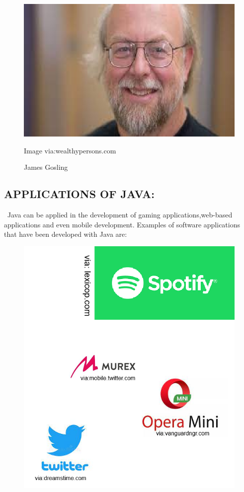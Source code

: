 \documentclass[12pt]{article}
\begin{document}
           
\begin{figure}[h]
	\includegraphics[width=0.7\linewidth]{screenshot009}
	\caption{James Gosling}{Image via:wealthypersons.com}
	\label{fig:screenshot009}
\end{figure}

\newpage

\subsection{APPLICATIONS OF JAVA:}
           \ Java can be applied in the development of gaming applications,web-based applications and even mobile development. Examples of software applications that have been developed with Java are:
           
\begin{figure}[h]
	\includegraphics[width=0.7\linewidth]{screenshot010}
	\caption{}
	\label{fig:screenshot010}
\end{figure}
\end{document}
